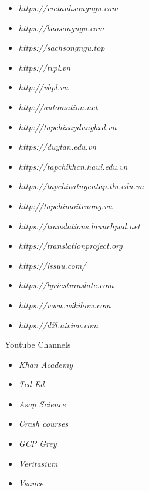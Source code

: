 \documentclass[11pt]{article}
\begin{document}
\begin{itemize}
\color{darkblue}
\item \textsl{https://vietanhsongngu.com }
\item \textsl{https://baosongngu.com}
\item \textsl{https://sachsongngu.top}
\item \textsl{https://tvpl.vn}
\item \textsl{http://vbpl.vn}
\item \textsl{http://automation.net}
\item \textsl{http://tapchixaydungbxd.vn}
\item \textsl{https://duytan.edu.vn}
\item \textsl{https://tapchikhcn.haui.edu.vn}
\item \textsl{https://tapchivatuyentap.tlu.edu.vn}
\item \textsl{http://tapchimoitruong.vn}
\item \textsl{https://translations.launchpad.net}
\item \textsl{https://translationproject.org}
\item \textsl{https://issuu.com/}
\item \textsl{https://lyricstranslate.com}
\item \textsl{https://www.wikihow.com}
\item \textsl{https://d2l.aivivn.com}
\end{itemize}
Youtube Channels
\begin{itemize}
\color{darkblue}
\item \textsl{Khan Academy }
\item \textsl{Ted Ed}
\item \textsl{Asap Science}
\item \textsl{Crash courses}
\item \textsl{GCP Grey}
\item \textsl{Veritasium}
\item \textsl{Vsauce}  
\end{itemize}
\end{document}
